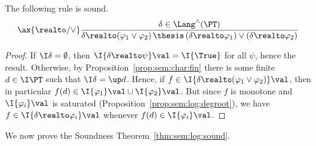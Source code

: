 \begin{lemma}
\label{lem:proof:sem:log:sound:realtolor}
The following rule is sound.
\[
\ax{{\realto}/\lor}
\dfrac{\delta \in \Lang^\land(\PT)}
  {\delta \realto (\varphi_1 \lor \varphi_2)
  \,\thesis\,
  (\delta \realto \varphi_1) \lor (\delta \realto \varphi_2)}
\]
\end{lemma}

\begin{proof}
If $\I\delta = \emptyset$,
then $\I{\delta \realto \psi}\val = \I{\True}$ for all $\psi$,
hence the result.
Otherwise,
by Proposition~\ref{prop:sem:char:fin}
there is some finite $d \in \I\PT$ such that $\I\delta = \up d$.
Hence, 
if $f \in \I{\delta \realto (\varphi_1 \lor \varphi_2)}\val$,
then in particular $f(d) \in \I{\varphi_1}\val \cup \I{\varphi_2}\val$.
But since $f$ is monotone and
$\I{\varphi_i}\val$ is saturated (Proposition~\ref{prop:sem:log:degroot}),
we have
$f \in \I{\delta \realto \varphi_i}\val$
whenever $f(d) \in \I{\varphi_i}\val$.
\end{proof}


We now prove the Soundness Theorem~\ref{thm:sem:log:sound}.

\ThmLogSound*

